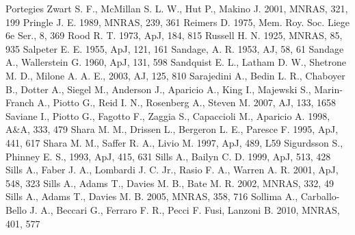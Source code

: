 \begin{thebibliography}{99}
 Portegies Zwart S. F., McMillan
  S. L. W., Hut P., Makino J. 2001, MNRAS, 321, 199
 Pringle
  J. E. 1989, MNRAS, 239, 361
 Reimers
  D. 1975, Mem. Roy. Soc. Liege 6e Ser., 8, 369  
 Rood
  R. T. 1973, ApJ, 184, 815
 Russell
  H. N. 1925, MNRAS, 85, 935
 Salpeter
  E. E. 1955, ApJ, 121, 161
 Sandage,
  A. R. 1953, AJ, 58, 61
  Sandage A., Wallerstein G. 1960, ApJ, 131, 598
  Sandquist E. L., Latham D. W., Shetrone M. D., Milone
  A. A. E., 2003, AJ, 125, 810
  Sarajedini A., Bedin L. R., Chaboyer B., Dotter  A., Siegel M.,
  Anderson J., Aparicio A., King I., Majewski S., Marin-Franch A.,
  Piotto G., Reid  I. N., Rosenberg A., Steven M. 2007, AJ, 133, 1658
  Saviane I., Piotto G., Fagotto F., Zaggia S., Capaccioli M.,
  Aparicio A. 1998, A\&A, 333, 479
 Shara
  M. M., Drissen L., Bergeron L. E.,  Paresce F. 1995, ApJ, 441, 617
 Shara M. M., Saffer R. A., Livio M. 1997,
  ApJ, 489, L59
 Sigurdsson S., Phinney
  E. S., 1993, ApJ, 415, 631
  Sills A., Bailyn C. D. 1999, ApJ, 513, 428
  Sills
  A., Faber J. A., Lombardi J. C. Jr., Rasio F. A., Warren A. R.
  2001, ApJ, 548, 323
  Sills
  A., Adams T., Davies M. B., Bate M. R. 2002, MNRAS, 332, 49
  Sills
  A., Adams T., Davies M. B. 2005, MNRAS, 358, 716
  Sollima A., Carballo-Bello J. A., Beccari G., Ferraro F. R., Pecci
  F. Fusi, Lanzoni B. 2010, MNRAS, 401, 577 

\end{thebibliography}
